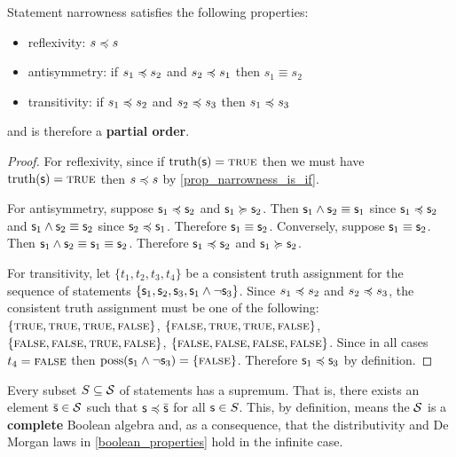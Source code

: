 \documentclass[11pt,letterpaper,fleqn]{memoir} %
\begin{document}
\begin{mathSection}
\begin{prop}
	Statement narrowness satisfies the following properties:
	\begin{itemize}
		\item reflexivity: $s \preccurlyeq s$
		\item antisymmetry: if $s_1 \preccurlyeq s_2$ and  $s_2 \preccurlyeq s_1$ then $s_1 \equiv s_2$
		\item transitivity: if $s_1 \preccurlyeq s_2$ and $s_2 \preccurlyeq s_3$ then $s_1 \preccurlyeq s_3$
	\end{itemize}
	and is therefore a \textbf{partial order}.
\end{prop}
\begin{proof}
	For reflexivity, since if $\operatorname{truth}(\mathsf{s}) = \textsc{true}$ then we must have $\operatorname{truth}(\mathsf{s}) = \textsc{true}$ then $s \preccurlyeq s$ by \eqref{prop_narrowness_is_if}.
	
	For antisymmetry, suppose $\mathsf{s}_1 \preccurlyeq \mathsf{s}_2$ and $\mathsf{s}_1 \succcurlyeq \mathsf{s}_2$. Then $\mathsf{s}_1 \wedge \mathsf{s}_2 \equiv \mathsf{s}_1$ since $\mathsf{s}_1 \preccurlyeq \mathsf{s}_2$ and $\mathsf{s}_1 \wedge \mathsf{s}_2 \equiv \mathsf{s}_2$ since $\mathsf{s}_2 \preccurlyeq \mathsf{s}_1$. Therefore $\mathsf{s}_1 \equiv \mathsf{s}_2$. Conversely, suppose $\mathsf{s}_1 \equiv \mathsf{s}_2$. Then $\mathsf{s}_1 \wedge \mathsf{s}_2 \equiv \mathsf{s}_1 \equiv \mathsf{s}_2$. Therefore $\mathsf{s}_1 \preccurlyeq \mathsf{s}_2$ and $\mathsf{s}_1 \succcurlyeq \mathsf{s}_2$.
	
	For transitivity, let $\{t_1, t_2, t_3, t_4\}$ be a consistent truth assignment for the sequence of statements $\{\mathsf{s}_1, \mathsf{s}_2, \mathsf{s}_3, \mathsf{s}_1 \wedge \neg\mathsf{s}_3\}$.  Since $s_1 \preccurlyeq s_2$ and $s_2 \preccurlyeq s_3$, the consistent truth assignment must be one of the following: $\{\textsc{true}, \textsc{true}, \textsc{true}, \textsc{false}\}$, $\{\textsc{false}, \textsc{true}, \textsc{true}, \textsc{false}\}$, $\{\textsc{false}, \textsc{false}, \textsc{true}, \textsc{false}\}$, $\{\textsc{false}, \textsc{false}, \textsc{false}, \textsc{false}\}$.
	Since in all cases $t_4=\textsc{false}$ then $\operatorname{poss}(\mathsf{s}_1 \wedge \neg\mathsf{s}_3) = \{\textsc{false}\}$. Therefore $\mathsf{s}_1 \preccurlyeq \mathsf{s}_3$ by definition.
\end{proof}

\begin{prop}
	Every subset $S \subseteq \mathcal{S}$ of statements has a supremum. That is, there exists an element $\bar{\mathsf{s}} \in \mathcal{S}$ such that $\mathsf{s} \preccurlyeq \bar{\mathsf{s}}$ for all $\mathsf{s} \in S$. This, by definition, means the $\mathcal{S}$ is a \textbf{complete} Boolean algebra and, as a consequence, that the distributivity and De Morgan laws in \ref{boolean_properties} hold in the infinite case.
\end{prop}


\end{mathSection}
\end{document}
